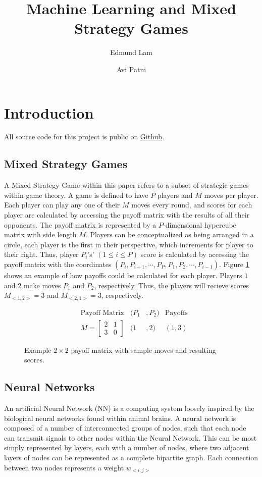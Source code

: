 \documentclass{article}
\title{Machine Learning and Mixed Strategy Games}
\author{Edmund Lam \and Avi Patni}
\begin{document}
\begin{titlepage}
	\maketitle
	\thispagestyle{empty}
\end{titlepage}
\newpage
  \tableofcontents
\newpage

\section{Introduction}
All source code for this project is public on \href{https://github.com/UnsignedByte/MLMS}{Github}.
\subsection{Mixed Strategy Games}
\label{subsection:MSG}
A Mixed Strategy Game within this paper refers to a subset of strategic games within game theory. A game is defined to have $P$ players and $M$ moves per player. Each player can play any one of their $M$ moves every round, and scores for each player are calculated by accessing the payoff matrix with the results of all their opponents. The payoff matrix is represented by a $P$-dimensional hypercube matrix with side length $M$. Players can be conceptualized as being arranged in a circle, each player is the first in their perspective, which increments for player to their right. Thus, player $P_i$'s' $(1\leq i\leq P)$ score is calculated by accessing the payoff matrix with the coordinates $(P_i, P_{i+1}, \cdots , P_P, P_1, P_2, \cdots , P_{i-1})$. Figure \ref{fig:1} shows an example of how payoffs could be calculated for each player. Players $1$ and $2$ make moves $P_1$ and $P_2$, respectively. Thus, the players will recieve scores $M_{<1,2>}=3$ and $M_{<2,1>}=3$, respectively.

\begin{figure}[h]
  \caption{Example $2\times2$ payoff matrix with sample moves and resulting scores.}
	\label{fig:1}
	\begin{align*}
	&\text{Payoff Matrix} &(P_1&,P_2) &\text{Payoffs}\\
  &M=
  \begin{bmatrix}
	  2 & 1\\
	  3 & 0
  \end{bmatrix}
  &(1&,2)
  &(1,3)
  \end{align*}
\end{figure}

\subsection{Neural Networks}
An artificial Neural Network (NN) is a computing system loosely inspired by the biological neural networks found within animal brains. A neural network is composed of a number of interconnected groups of nodes, such that each node can transmit signals to other nodes within the Neural Network. This can be most simply represented by layers, each with a number of nodes, where two adjacent layers of nodes can be represented as a complete bipartite graph. Each connection between two nodes represents a weight $w_{<i,j>}$
\end{document}

